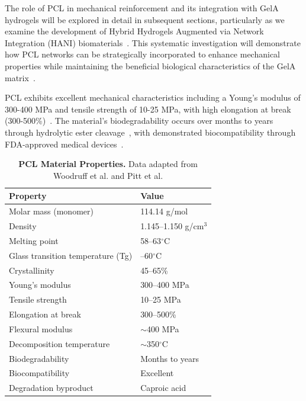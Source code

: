 The role of PCL in mechanical reinforcement and its integration with GelA hydrogels will be explored in detail in subsequent sections, particularly as we examine the development of Hybrid Hydrogels Augmented via Network Integration (HANI) biomaterials~\cite{elkommos2025hybridhydrogels}. This systematic investigation will demonstrate how PCL networks can be strategically incorporated to enhance mechanical properties while maintaining the beneficial biological characteristics of the GelA matrix~\cite{zhang20173dprintedpolyecaprolactone, yang2016multilayeredpolycaprolactone}.

PCL exhibits excellent mechanical characteristics including a Young's modulus of 300-400 MPa and tensile strength of 10-25 MPa, with high elongation at break (300-500\%)~\cite{woodruff2010returnforgotten, pitt1981aliphaticpolyesters}. The material's biodegradability occurs over months to years through hydrolytic ester cleavage~\cite{gao2018electrospunfiber}, with demonstrated biocompatibility through FDA-approved medical devices~\cite{gautam2013fabricationcharacterization, zhang2005electrospinninggelatin}.

\begin{table}[H]
    \centering
    \caption[PCL Material Properties.]{\textbf{PCL Material Properties.} Data adapted from Woodruff et al. \cite{woodruff2010returnforgotten} and Pitt et al. \cite{pitt1981aliphaticpolyesters}}
    \label{tab:PCL-properties}
    \setlength{\tabcolsep}{8pt}
    \begin{tabular}{|p{4.5cm}|p{4cm}|}
        \hline
        \cellcolor{gray!20}\textbf{Property} & \cellcolor{gray!20}\textbf{Value} \\[0.3em]
        \hline
        Molar mass (monomer) & 114.14 g/mol \\[0.3em]
        \hline
        Density & 1.145--1.150 g/cm$^3$ \\[0.3em]
        \hline
        Melting point & 58--63$^\circ$C \\[0.3em]
        \hline
        Glass transition temperature (Tg) & --60$^\circ$C \\[0.3em]
        \hline
        Crystallinity & 45--65\% \\[0.3em]
        \hline
        Young's modulus & 300--400 MPa \\[0.3em]
        \hline
        Tensile strength & 10--25 MPa \\[0.3em]
        \hline
        Elongation at break & 300--500\% \\[0.3em]
        \hline
        Flexural modulus & $\sim$400 MPa \\[0.3em]
        \hline
        Decomposition temperature & $\sim$350$^\circ$C \\[0.3em]
        \hline
        Biodegradability & Months to years \\[0.3em]
        \hline
        Biocompatibility & Excellent \\[0.3em]
        \hline
        Degradation byproduct & Caproic acid \\[0.3em]
        \hline
    \end{tabular}
\end{table}




